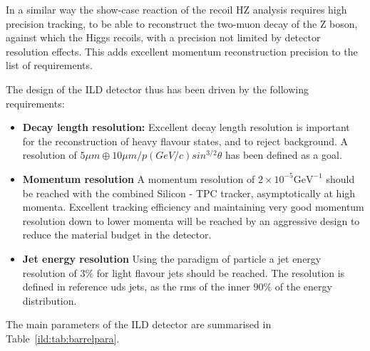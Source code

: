 \documentclass[%
 amsmath,amssymb,
 aps,
]{revtex4-1}
\begin{document}
In a similar way the show-case reaction of the recoil HZ analysis requires high precision tracking, to be able to reconstruct the two-muon decay of the Z boson, against which the Higgs recoils, with a precision not limited by detector resolution effects. This adds excellent momentum reconstruction precision to the list of requirements. 

The design of the ILD detector thus has been driven by the following requirements: 
\begin{itemize}
    \item {\bf Decay length resolution:} Excellent decay length resolution is important for the reconstruction of heavy flavour states, and to reject background. A resolution of $ 5 \mu m \oplus 10 \mu m / p(GeV/c)sin^{3/2}\theta$ has been defined as a goal. 
    \item {\bf Momentum resolution} A momentum resolution of $2 \times 10^{-5} \mathrm{GeV}^{-1}$ should be reached with the combined Silicon - TPC tracker, asymptotically at high momenta. Excellent tracking efficiency and maintaining very good momentum resolution down to lower momenta will be reached by an aggressive design to reduce the material budget in the detector. 
    \item {\bf Jet energy resolution} Using the paradigm of particle a jet energy resolution of $3\%$ for light flavour jets should be reached. The resolution is defined in reference uds jets, as the rms of the inner $90\%$ of the energy distribution. 
\end{itemize}


The main parameters of the ILD detector are summarised in Table~\ref{ild:tab:barrelpara}.
\end{document}

